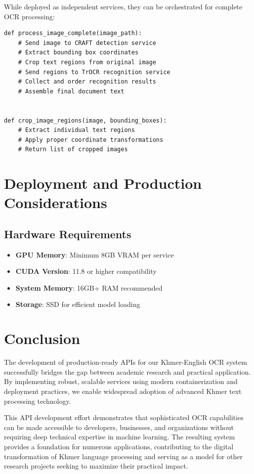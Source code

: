 {While deployed as independent services, they can be orchestrated for complete OCR processing:

\begin{verbatim}
def process_image_complete(image_path):
    # Send image to CRAFT detection service
    # Extract bounding box coordinates
    # Crop text regions from original image
    # Send regions to TrOCR recognition service
    # Collect and order recognition results
    # Assemble final document text


def crop_image_regions(image, bounding_boxes):
    # Extract individual text regions
    # Apply proper coordinate transformations
    # Return list of cropped images

\end{verbatim}

\section{Deployment and Production Considerations}
\label{sec:deployment}

\subsection{Hardware Requirements}
\label{subsec:hardware}

\begin{itemize}
\item \textbf{GPU Memory}: Minimum 8GB VRAM per service
\item \textbf{CUDA Version}: 11.8 or higher compatibility
\item \textbf{System Memory}: 16GB+ RAM recommended
\item \textbf{Storage}: SSD for efficient model loading
\end{itemize}


\section{Conclusion}
\label{sec:conclusion}

The development of production-ready APIs for our Khmer-English OCR system successfully bridges the gap between academic research and practical application. By implementing robust, scalable services using modern containerization and deployment practices, we enable widespread adoption of advanced Khmer text processing technology.

This API development effort demonstrates that sophisticated OCR capabilities can be made accessible to developers, businesses, and organizations without requiring deep technical expertise in machine learning. The resulting system provides a foundation for numerous applications, contributing to the digital transformation of Khmer language processing and serving as a model for other research projects seeking to maximize their practical impact.

}